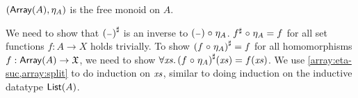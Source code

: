%
\begin{propositionrep}
    \label{array:univ}
    \leavevmode
    $(\operatorname{\mathsf{Array}}(A),\eta_A)$ is the free monoid on $A$.
\end{propositionrep}
%
\begin{proofsketch}
    We need to show that $\ext{(\blank)}$ is an inverse to ${(\blank) \comp \eta_A}$.
    ${f}^{\sharp} \mathrel{\circ} \eta_A = f$ for all set functions $f : A \to X$ holds trivially.
    To show ${(f \mathrel{\circ} \eta_A)}^{\sharp} = f$ for all homomorphisms $f : \operatorname{\mathsf{Array}}(A) \to \mathfrak{X}$,
    we need to show $\forall \mathit{xs}.\, {(f \mathrel{\circ} \eta_A)}^{\sharp}(\mathit{xs}) = f(\mathit{xs})$.
    We use \cref{array:eta-suc,array:split} to do induction on $\mathit{xs}$,
    similar to doing induction on the inductive datatype $\operatorname{\mathsf{List}}(A)$.
\end{proofsketch}
%
